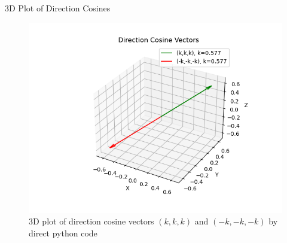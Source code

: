 \documentclass{beamer}
\numberwithin{equation}{section}
\begin{document}
\begin{frame}{3D Plot of Direction Cosines}

\begin{figure}[h!]
  \centering
  \includegraphics[width=0.6\columnwidth]{figs/Figure_2.png} 
   \caption*{3D plot of direction cosine vectors $(k,k,k)$ and $(-k,-k,-k)$ by direct python code}
   \label{Fig:dircosines}
\end{figure}
    
\end{frame}
\end{document}
